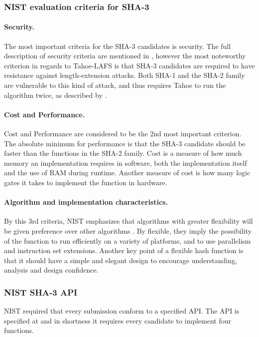 \documentclass[english,12pt,a4paper]{book}
\begin{document}
\subsubsection{\ac{NIST} evaluation criteria for \ac{SHA}-3}

\paragraph{Security.} The most important criteria for the SHA-3
candidates\cite{s_nistround2} is security. The full description of security
criteria are mentioned in \cite{s_fedreg}, however the most noteworthy criterion
in regards to Tahoe-\ac{LAFS} is that \ac{SHA}-3 candidates are required to have
resistance against length-extension attacks. Both \ac{SHA}-1 and the \ac{SHA}-2
family are vulnerable to this kind of attack, and thus requires
Tahoe to run the algorithm twice, as described by \citet{schneier}.

\paragraph{Cost and Performance.} Cost and Performance are considered to be the
2nd most important criterion. The absolute minimum for performance is that the
SHA-3 candidate should be faster than the functions in the \ac{SHA}-2 family.
Cost is a measure of how much memory an implementation requires in software,
both the implementation itself and the use of \ac{RAM} during runtime. Another
measure of cost is how many logic gates it takes to implement the function in
hardware.

\paragraph{Algorithm and implementation characteristics.} By this 3rd criteria,
\ac{NIST} emphasizes that algorithms with greater flexibility will be given
preference over other algorithms \cite{s_nistround2}. By flexible, they imply
the possibility of the function to run efficiently on a variety of platforms,
and to use parallelism and instruction set extensions. Another key point of a
flexible hash function is that it should have a simple and elegant design to
encourage understanding, analysis and design confidence.

\subsubsection{\ac{NIST} \ac{SHA}-3 \ac{API}}
\ac{NIST} required that every submission conform to a specified
\ac{API}\cite{s_fedreg}. The \ac{API} is specified at \cite{s_nistapi} and in
shortness it requires every candidate to implement four functions.
\end{document}
